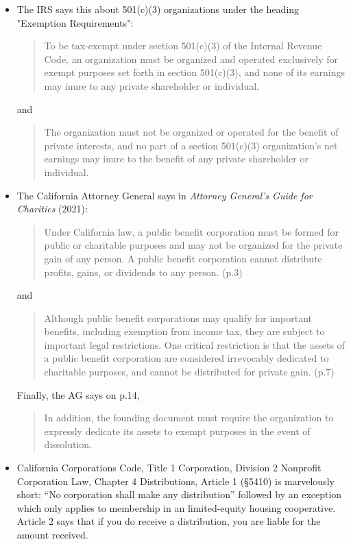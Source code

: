   \begin{itemize}
    \item The IRS says this about 501(c)(3) organizations under the heading "Exemption Requirements":
    \begin{quote}\noindent
      To be tax-exempt under section 501(c)(3) of the Internal Revenue Code, an organization must be organized and operated exclusively for exempt purposes set forth in section 501(c)(3), and none of its earnings may inure to any private shareholder or individual.
    \end{quote}
    and
    \begin{quote}
      The organization must not be organized or operated for the benefit of private interests, and no part of a section 501(c)(3) organization's net earnings may inure to the benefit of any private shareholder or individual.
    \end{quote}
    \item The California Attorney General says in \textit{Attorney General's Guide for Charities} (2021):
    \begin{quote}
      Under California law, a public beneﬁt corporation must be formed for public or charitable purposes and may not be organized for the private gain of any person. A public beneﬁt corporation cannot distribute proﬁts, gains, or dividends to any person. (p.3)
    \end{quote}
    and
    \begin{quote}
      Although public beneﬁt corporations may qualify for important beneﬁts, including exemption from income tax, they are subject to important legal restrictions. One critical restriction is that the assets of a public beneﬁt corporation are considered irrevocably dedicated to charitable purposes, and cannot be distributed for private gain. (p.7)
    \end{quote}
    Finally, the AG says on p.14,
    \begin{quote}
      In addition, the founding document must require the organization to expressly dedicate its assets to exempt purposes in the event of dissolution.
    \end{quote}
    \item California Corporations Code, Title 1 Corporation, Division 2 Nonprofit Corporation Law, Chapter 4 Distributions, Article 1 (§5410) is marvelously short: ``No corporation shall make any distribution'' followed by an exception which only applies to membership in an limited-equity housing cooperative. Article 2 says that if you do receive a distribution, you are liable for the amount received.
  \end{itemize}%
